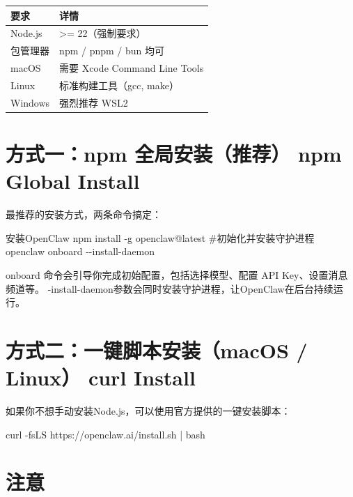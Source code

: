 \documentclass[
  10
]{article}
\newenvironment{Shaded}{}{}
\newcommand{\NormalTok}[1]{#1}
\newcounter{none} %
\begin{document}
{\def\LTcaptype{none} %
\begin{longtable}[]{@{}|l|l|@{}}
\toprule\noalign{}
\endhead
\bottomrule\noalign{}
\endlastfoot
\hline
要求 & 详情 \\
\hline
Node.js & \textgreater= 22（强制要求） \\
\hline
包管理器 & npm / pnpm / bun 均可 \\
\hline
macOS & 需要 Xcode Command Line Tools \\
\hline
Linux & 标准构建工具（gcc, make） \\
\hline
Windows & 强烈推荐 WSL2 \\
\hline
\end{longtable}
}

\section{方式一：npm 全局安装（推荐） npm Global
Install}\label{ux65b9ux5f0fux4e00npm-ux5168ux5c40ux5b89ux88c5ux63a8ux8350-npm-global-install}

最推荐的安装方式，两条命令搞定：

\begin{Shaded}
\begin{Highlighting}[]
\NormalTok{安装OpenClaw  }
\NormalTok{npm install {-}g openclaw@latest  }
\NormalTok{\#初始化并安装守护进程  }
\NormalTok{openclaw onboard {-}{-}install{-}daemon}
\end{Highlighting}
\end{Shaded}

onboard 命令会引导你完成初始配置，包括选择模型、配置 API
Key、设置消息频道等。
-install-daemon参数会同时安装守护进程，让OpenClaw在后台持续运行。

\section{方式二：一键脚本安装（macOS / Linux） curl
Install}\label{ux65b9ux5f0fux4e8cux4e00ux952eux811aux672cux5b89ux88c5macos-linux-curl-install}

如果你不想手动安装Node.js，可以使用官方提供的一键安装脚本：

\begin{Shaded}
\begin{Highlighting}[]
\NormalTok{curl {-}fsLS https://openclaw.ai/install.sh | bash}
\end{Highlighting}
\end{Shaded}

\section{注意}\label{ux6ce8ux610f-2}
\end{document}
